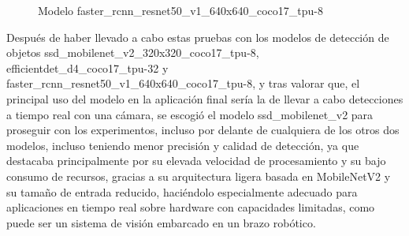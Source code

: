   	\begin{figure}[H]
    		\begin{center}
      		\subcapcentertrue
      		\hspace{2mm}
    	\end{center}
    	\caption{Modelo faster\_rcnn\_resnet50\_v1\_640x640\_coco17\_tpu-8 }
    	\label{fig:modelo_faster_rcnn_resnet50}
  	\end{figure}	
  	
\pagebreak
Después de haber llevado a cabo estas pruebas con los modelos de detección de objetos ssd\_mobilenet\_v2\_320x320\_coco17\_tpu-8, efficientdet\_d4\_coco17\_tpu-32 y faster\_rcnn\_resnet50\_v1\_640x640\_coco17\_tpu-8, y tras valorar que, el principal uso del modelo en la aplicación final sería la de llevar a cabo detecciones a tiempo real con una cámara, se escogió el modelo ssd\_mobilenet\_v2 para proseguir con los experimentos, incluso por delante de cualquiera de los otros dos modelos, incluso teniendo menor precisión y calidad de detección, ya que destacaba principalmente por su elevada velocidad de procesamiento y su bajo consumo de recursos, gracias a su arquitectura ligera basada en MobileNetV2 y su tamaño de entrada reducido, haciéndolo especialmente adecuado para aplicaciones en tiempo real sobre hardware con capacidades limitadas, como puede ser un sistema de visión embarcado en un brazo robótico.\\


